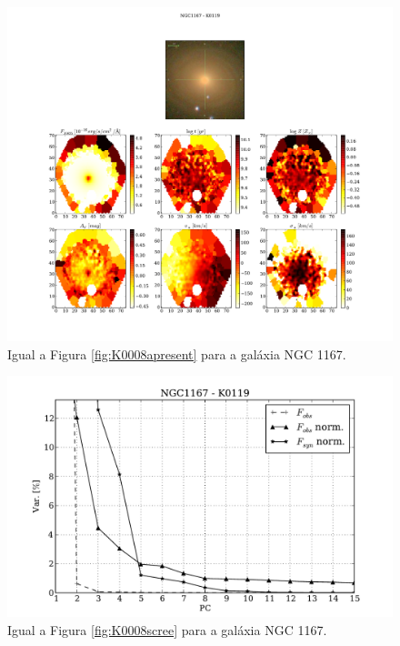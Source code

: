\begin{figure}
    \includegraphics[width=1.\textwidth]{figuras/K0119-apresent.pdf}
    \caption[Propriedades f\'isicas da gal\'axia NGC 1167.]
    {Igual a Figura \ref{fig:K0008apresent} para a galáxia NGC 1167.}
    \label{fig:K0119apresent}
\end{figure}

\begin{figure}
    \includegraphics[height=0.33\textheight]{figuras/K0119-screetest.pdf}
    \caption[Scree test comparativo entre 3 PCAs - NGC 1167.]
    {Igual a Figura \ref{fig:K0008scree} para a galáxia NGC 1167.}
    \label{fig:K0119scree}
\end{figure}

